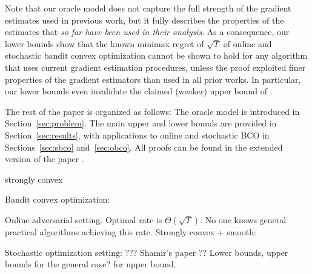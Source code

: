 Note that our oracle model does not capture the full strength of the gradient estimates used in previous work, but it fully describes the properties of the estimates that \emph{so far have been used in their analysis}.
As a consequence, our lower bounds show that the known minimax regret of $\sqrt{T}$ \citep{BubeckDKP15,BuEl15}
of online and stochastic bandit convex optimization cannot be shown to hold
for any algorithm that uses current gradient estimation procedures, unless the proof exploited finer properties
of the gradient estimators than used in all prior works. In particular,
our lower bounds even invalidate the claimed (weaker) upper bound of \citet{DeElKo15}.


The rest of the paper is organized as follows: The oracle model is introduced in Section~\ref{sec:problem}. The main upper and lower bounds are provided in Section~\ref{sec:results}, with applications to online and stochastic BCO in Sections~\ref{sec:sbco} and~\ref{sec:obco}. All proofs can be found in the extended version of the paper \citep{HuPrGySz16long}.



strongly convex


Bandit convex optimization:

Online adversarial setting. Optimal rate is $\Theta(\sqrt{T})$.
No one knows general practical algorithms achieving this rate.
Strongly convex + smooth: \cite{hazan2014bandit}

Stochastic optimization setting: ??? Shamir's paper \cite{shamir2012complexity}??
Lower bounds, upper bounds for the general case?
\cite{hazan2014bandit} for upper bound.

